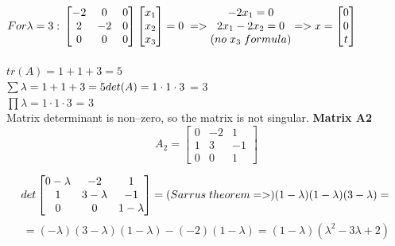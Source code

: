 \documentclass[eng,openany]{mgr}
\begin{document}
\begin{math}
For \lambda = 3:\\
\begin{bmatrix}
-2 & 0 & 0  \\
2 & -2 & 0 \\
0 & 0 & 0 
\end{bmatrix}
\begin{bmatrix}
x_1 \\
x_2 \\
x_3
\end{bmatrix}
= 0\; =>
\begin{matrix}
-2x_1 = 0\\
2x_1 -2x_2 = 0\\
(no\;x_3\;formula)
\end{matrix}
=>
x = 
\begin{bmatrix}
0\\
0 \\
t
\end{bmatrix}
\end{math}
\\ \\ 
$tr(A) = 1 + 1 + 3 = 5$\\
$\sum \lambda = 1 + 1 + 3 = 5
\\ \\
det(A) = 1 \cdot 1 \cdot 3$ = 3\\
$\prod \lambda = 1 \cdot 1 \cdot 3$ = 3
\\
Matrix determinant is non--zero, so the matrix is not singular.
\newpage
\textbf{Matrix A2}
\[
A_2 =
\begin{bmatrix}
	0 & -2 & 1  \\
	1 & 3 & -1 \\
	0 & 0 & 1 
\end{bmatrix}
\]

\[
det
\begin{bmatrix}
0-\lambda & -2 & 1  \\
1 & 3-\lambda & -1 \\
0 & 0 & 1-\lambda 
\end{bmatrix}
= (Sarrus\;theorem =>)(1-\lambda)(1-\lambda)(3-\lambda) = \\ 
\]
\[
= (-\lambda)(3-\lambda)(1-\lambda) - (-2)(1-\lambda) = (1-\lambda)(\lambda ^2 - 3\lambda + 2)
\]
\end{document}
